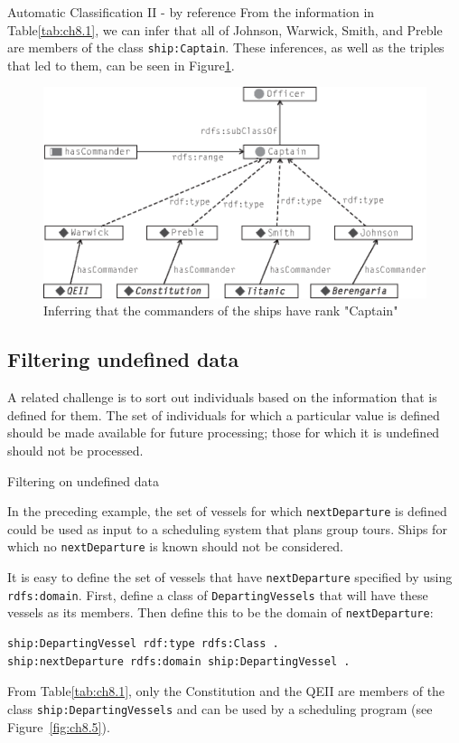 \begin{challenge}{Automatic Classification II - by reference }
From the information in Table\ref{tab:ch8.1}, we can infer that all of Johnson,
Warwick, Smith, and Preble are members of the class \texttt{ship:Captain}. These
inferences, as well as the triples that led to them, can be seen in
Figure\ref{fig:ch8.4}.

\begin{figure}
\centering
\includegraphics[width=5in]{media/ch8/f08-4.eps}
\caption{Inferring that the commanders of the ships have rank "Captain"}
\label{fig:ch8.4}
\end{figure}


\end{challenge}

\subsection{Filtering undefined data}

A related challenge is to sort out individuals based on the information
that is defined for them. The set of individuals for which a particular
value is defined should be made available for future processing; those
for which it is undefined should not be processed.

\begin{challenge}{Filtering on undefined data}
\label{chal:12}

In the preceding example, the set of vessels for which \texttt{nextDeparture} is
defined could be used as input to a scheduling system that plans group
tours. Ships for which no \texttt{nextDeparture} is known should not be
considered.

\solution

It is easy to define the set of vessels that have \texttt{nextDeparture}
specified by using \texttt{rdfs:domain}. First, define a class of
\texttt{DepartingVessels} that will have these vessels as its members. Then
define this to be the domain of \texttt{nextDeparture}:

\begin{lstlisting}
ship:DepartingVessel rdf:type rdfs:Class .
ship:nextDeparture rdfs:domain ship:DepartingVessel .
\end{lstlisting}

From Table\ref{tab:ch8.1}, only the Constitution and the QEII are members of the
class 
\texttt{ship:DepartingVessels} and can be used by a scheduling program (see
Figure~\ref{fig:ch8.5}).
\end{challenge}


